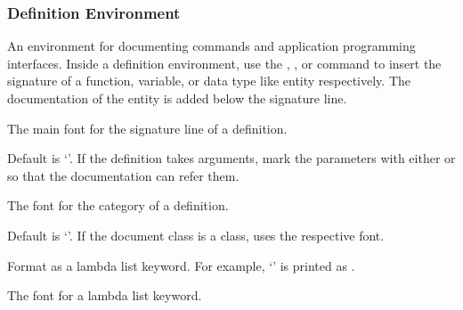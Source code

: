 \documentclass{scrartcl}
\begin{document}
{\subsubsection{Definition Environment}

\begin{definition}
An environment for documenting commands and application programming
interfaces.  Inside a definition environment, use the ,
, or  command to insert the signature of
a function, variable, or data type like entity respectively.  The
documentation of the entity is added below the signature line.
\end{definition}

\begin{definition}
The main font for the signature line of a definition.

Default is ‘\code{\\normalfont\\slshape}’.  If the definition
takes arguments, mark the parameters with either 
or  so that the documentation can refer them.
\end{definition}

\begin{definition}
The font for the category of a definition.

Default is ‘\code{\\normalfont\\bfseries\\small}’.  If the document
class is a \KOMAScript{} class,  uses
the respective  font.
\end{definition}

\begin{definition}
 
Format  as a lambda list keyword.  For example,
‘’ is printed as
.
\end{definition}

\begin{definition}
The font for a lambda list keyword.


\end{definition}}
\end{document}
